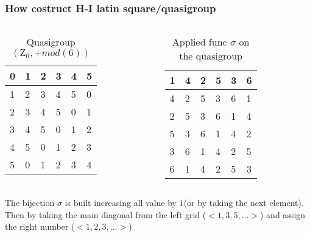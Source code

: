 \begin{frame}
\frametitle{How costruct H-I latin square/quasigroup}

\begin{columns}
	\pause[1]
	\begin{table}
		\centering
		\begin{tabular}{|l|l|l|l|l|l|} 
			\hline
			0 & 1 & 2 & 3 & 4 & 5                       \\ 
			\hline
			1 & 2 & 3 & 4 & 5 & 0                       \\ 
			\hline
			2 & 3 & 4 & 5 & 0 & 1                       \\ 
			\hline
			3 & 4 & 5 & 0 & 1 & 2                       \\ 
			\hline
			4 & 5 & 0 & 1 & 2 & 3                       \\ 
			\hline
			5 & 0 & 1 & 2 & 3 & \multicolumn{1}{c|}{4}  \\
			\hline
		\end{tabular}
	\caption{Quasigroup $(\mathrm{Z}_6, + mod(6))$}
	\end{table}

	\pause[3]
	\begin{table}
		\centering
		\begin{tabular}{|l|l|l|l|l|l|} 
			\hline
			1 & 4 & 2 & 5 & 3 & 6                       \\ 
			\hline
			4 & 2 & 5 & 3 & 6 & 1                       \\ 
			\hline
			2 & 5 & 3 & 6 & 1 & 4                       \\ 
			\hline
			5 & 3 & 6 & 1 & 4 & 2                       \\ 
			\hline
			3 & 6 & 1 & 4 & 2 & 5                       \\ 
			\hline
			6 & 1 & 4 & 2 & 5 & \multicolumn{1}{c|}{3}  \\
			\hline
		\end{tabular}
	
	\caption{Applied func $\sigma$ on the quasigroup}
	\end{table}
	
\end{columns}

\pause[2]
The bijection $\sigma$ is built increasing all value by $1$(or by taking the next element). Then by taking the main diagonal from the left grid ($<1,3,5,...>$) and assign the right number ($<1,2,3,...>$) 
\end{frame}



